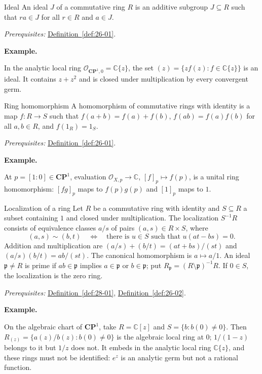 \documentclass[11pt]{article}
\makeatletter
\newcommand{\C}{\mathbb C}
\newcounter{definition}
\newcommand{\CP}{\mathbf{CP}}
\newcommand{\exampleheading}{\par\medskip\textbf{Example.}\par\smallskip}
\newcommand{\currentdefinition}[1]{\protected@edef\@currentlabel{#1}}
\makeatother
\begin{document}
\begin{definitionbox}{Ideal}
\currentdefinition{\thedefinition}
\label{def:28-01}
An ideal $J$ of a commutative ring $R$ is an additive subgroup $J\subseteq R$ such that $ra\in J$ for all $r\in R$ and $a\in J$.

\smallskip
\textit{Prerequisites:} \hyperref[def:26-01]{Definition~\ref*{def:26-01}}.

\exampleheading
In the analytic local ring $\mathcal O_{\CP^1,0}=\C\{z\}$, the set $(z)=\{zf(z):f\in\C\{z\}\}$ is an ideal. It contains $z+z^2$ and is closed under multiplication by every convergent germ.
\end{definitionbox}

\begin{definitionbox}{Ring homomorphism}
\currentdefinition{\thedefinition}
\label{def:26-02}
A homomorphism of commutative rings with identity is a map $f:R\to S$ such that $f(a+b)=f(a)+f(b)$, $f(ab)=f(a)f(b)$ for all $a,b\in R$, and $f(1_R)=1_S$.

\smallskip
\textit{Prerequisites:} \hyperref[def:26-01]{Definition~\ref*{def:26-01}}.

\exampleheading
At $p=[1:0]\in\CP^1$, evaluation $\mathcal O_{X,p}\to\C$, $[f]_p\mapsto f(p)$, is a unital ring homomorphism: $[fg]_p$ maps to $f(p)g(p)$ and $[1]_p$ maps to $1$.
\end{definitionbox}

\begin{definitionbox}{Localization of a ring}
\currentdefinition{\thedefinition}
\label{def:N02}
Let $R$ be a commutative ring with identity and $S\subseteq R$ a subset containing $1$ and closed under multiplication. The localization $S^{-1}R$ consists of equivalence classes $a/s$ of pairs $(a,s)\in R\times S$, where
\[(a,s)\sim(b,t)\quad\Longleftrightarrow\quad\text{there is }u\in S\text{ such that }u(at-bs)=0.\]
Addition and multiplication are $(a/s)+(b/t)=(at+bs)/(st)$ and $(a/s)(b/t)=ab/(st)$. The canonical homomorphism is $a\mapsto a/1$. An ideal $\mathfrak p\ne R$ is prime if $ab\in\mathfrak p$ implies $a\in\mathfrak p$ or $b\in\mathfrak p$; put $R_{\mathfrak p}=(R\setminus\mathfrak p)^{-1}R$. If $0\in S$, the localization is the zero ring.

\smallskip
\textit{Prerequisites:} \hyperref[def:28-01]{Definition~\ref*{def:28-01}}, \hyperref[def:26-02]{Definition~\ref*{def:26-02}}.

\exampleheading
On the algebraic chart of $\CP^1$, take $R=\C[z]$ and $S=\{b:b(0)\ne0\}$. Then $R_{(z)}=\{a(z)/b(z):b(0)\ne0\}$ is the algebraic local ring at $0$; $1/(1-z)$ belongs to it but $1/z$ does not. It embeds in the analytic local ring $\C\{z\}$, and these rings must not be identified: $e^z$ is an analytic germ but not a rational function.
\end{definitionbox}
\end{document}
